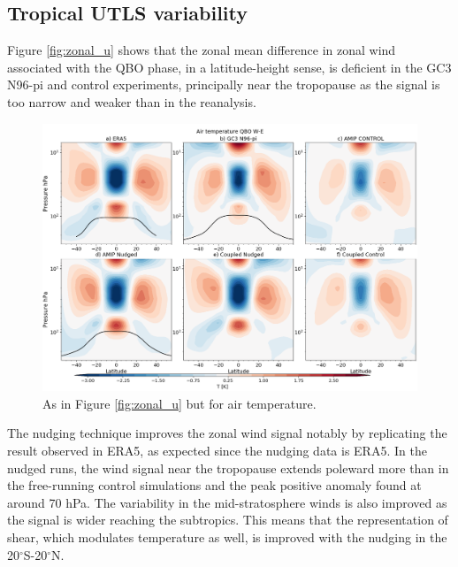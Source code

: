 \subsection{Tropical UTLS variability}


Figure \ref{fig:zonal_u} shows that the zonal mean difference in zonal wind associated with the QBO phase, in a latitude-height sense, is deficient in the GC3 N96-pi and control experiments, principally near the tropopause as the signal is too narrow and weaker than in the reanalysis.
 
\begin{figure}[b!]
\centering
 \includegraphics[width=\linewidth]{figures/zonalplotair_temperature.png}
\caption[Zonal mean air temperature QBO difference]{As in Figure \ref{fig:zonal_u} but for air temperature.  }
\label{fig:zonal_T}
\end{figure} 
 
The nudging technique improves the zonal wind signal notably by replicating the result observed in ERA5, as expected since the nudging data is ERA5.  In the nudged runs, the wind signal near the tropopause extends poleward more than in the free-running control simulations and the peak positive anomaly found at around 70 hPa. The variability in the mid-stratosphere winds is also improved as the signal is wider reaching the subtropics. This means that the representation of shear, which modulates temperature as well, is improved with the nudging in the 20$^\circ$S-20$^\circ$N.



